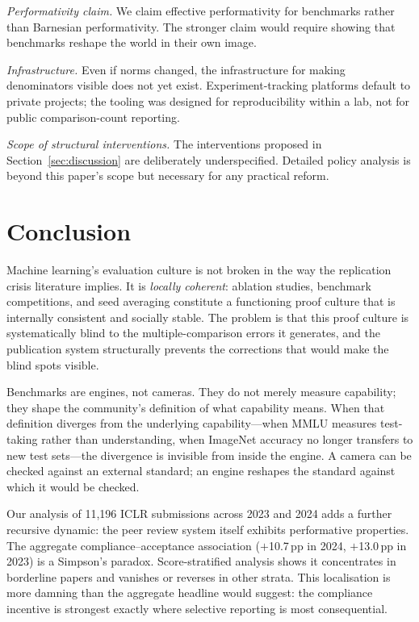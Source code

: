 \documentclass{article}
\begin{document}
\textit{Performativity claim.} We claim effective performativity for benchmarks rather than Barnesian performativity. The stronger claim would require showing that benchmarks reshape the world in their own image.

\textit{Infrastructure.} Even if norms changed, the infrastructure for making denominators visible does not yet exist. Experiment-tracking platforms default to private projects; the tooling was designed for reproducibility within a lab, not for public comparison-count reporting.

\textit{Scope of structural interventions.} The interventions proposed in Section~\ref{sec:discussion} are deliberately underspecified. Detailed policy analysis is beyond this paper's scope but necessary for any practical reform.

\section{Conclusion}

Machine learning's evaluation culture is not broken in the way the replication crisis literature implies. It is \textit{locally coherent}: ablation studies, benchmark competitions, and seed averaging constitute a functioning proof culture that is internally consistent and socially stable. The problem is that this proof culture is systematically blind to the multiple-comparison errors it generates, and the publication system structurally prevents the corrections that would make the blind spots visible.

Benchmarks are engines, not cameras. They do not merely measure capability; they shape the community's definition of what capability means. When that definition diverges from the underlying capability---when MMLU measures test-taking rather than understanding, when ImageNet accuracy no longer transfers to new test sets---the divergence is invisible from inside the engine. A camera can be checked against an external standard; an engine reshapes the standard against which it would be checked.

Our analysis of 11,196 ICLR submissions across 2023 and 2024 adds a further recursive dynamic: the peer review system itself exhibits performative properties. The aggregate compliance--acceptance association ($+$10.7\,pp in 2024, $+$13.0\,pp in 2023) is a Simpson's paradox. Score-stratified analysis shows it concentrates in borderline papers and vanishes or reverses in other strata. This localisation is more damning than the aggregate headline would suggest: the compliance incentive is strongest exactly where selective reporting is most consequential.
\end{document}
